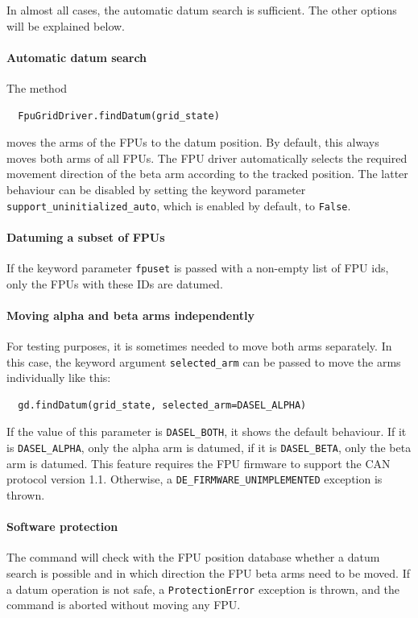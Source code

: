 \documentclass[11pt,a4paper]{scrartcl}
\begin{document}
In almost all cases, the automatic datum search is sufficient.  The
other options will be explained below.

\paragraph{Automatic datum search}

The method
\begin{verbatim}
  FpuGridDriver.findDatum(grid_state)
\end{verbatim}
moves the arms of the FPUs to the datum position.  By default, this
always moves both arms of all FPUs. The FPU driver automatically
selects the required movement direction of the beta arm according to
the tracked position. The latter behaviour can be disabled by setting
the keyword parameter \texttt{support\_uninitialized\_auto}, which is
enabled by default, to \texttt{False}.

\paragraph{Datuming a subset of FPUs}

If the keyword parameter \texttt{fpuset} is passed with a non-empty
list of FPU ids, only the FPUs with these IDs are datumed.


\paragraph{Moving alpha and beta arms independently}

For testing purposes, it is sometimes needed to move both arms
separately.  In this case, the keyword argument
\texttt{selected\_arm} can be passed to move the arms individually
like this:

\begin{verbatim}
  gd.findDatum(grid_state, selected_arm=DASEL_ALPHA)
\end{verbatim}

\begin{sloppypar}
If the value of this parameter is \texttt{DASEL\_BOTH}, it shows the
default behaviour. If it is \texttt{DASEL\_ALPHA}, only the alpha arm
is datumed, if it is \texttt{DASEL\_BETA}, only the beta arm is
datumed. This feature requires the FPU firmware to support the CAN
protocol version 1.1. Otherwise, a
\texttt{DE\_FIRMWARE\_UNIMPLEMENTED} exception is thrown.
\end{sloppypar}

\paragraph{Software protection}
The command will check with the FPU position database whether a datum
search is possible and in which direction the FPU beta arms need to be
moved. If a datum operation is not safe, a \texttt{ProtectionError}
exception is thrown, and the command is aborted without moving any
FPU.
\end{document}
